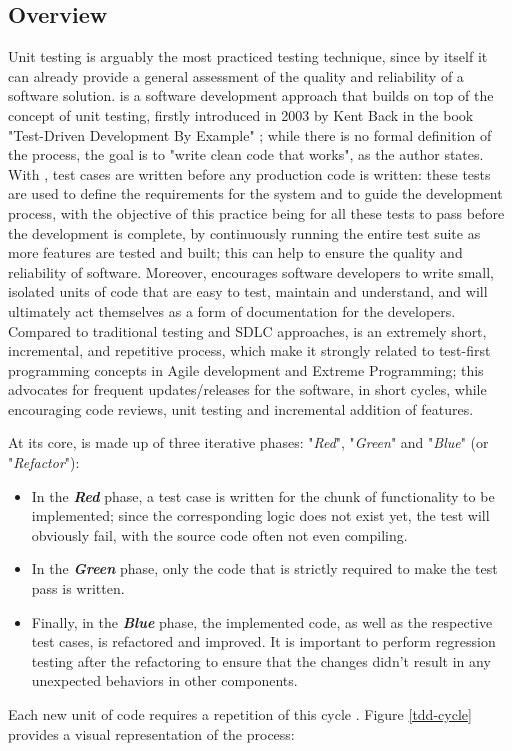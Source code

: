 \subsection{Overview}
Unit testing is arguably the most practiced testing technique, since by itself it can already provide a general assessment of the quality and reliability of a software solution. \tdd is a software development approach that builds on top of the concept of unit testing, firstly introduced in 2003 by Kent Back in the book "Test-Driven Development By Example" \cite{TDDByExample}; while there is no formal definition of the process, the goal is to "write clean code that works", as the author states. With \tdd, test cases are written before any production code is written: these tests are used to define the requirements for the system and to guide the development process, with 
the objective of this practice being for all these tests to pass before the development is complete, by continuously running the entire test suite as more features are tested and built; this can help to ensure the quality and reliability of software. Moreover, \tdd encourages software developers to write small, isolated units of code that are easy to test, maintain and understand, and will ultimately act themselves as a form of documentation for the developers. 
Compared to traditional testing and SDLC approaches, \tdd is an extremely short, incremental, and repetitive process, which make it strongly related to test-first programming concepts in Agile development and Extreme Programming; this advocates for frequent updates/releases for the software, in short cycles, while encouraging code reviews, unit testing and incremental addition of features.


At its core, \tdd is made up of three iterative phases: "\textit{Red}", "\textit{Green}" and "\textit{Blue}" (or "\textit{Refactor}"):
\begin{itemize}
    \item In the \textbf{\textit{Red}} phase, a test case is written for the chunk of functionality to be implemented; since the corresponding logic does not exist yet, the test will obviously fail, with the source code often not even compiling.
    \item In the \textbf{\textit{Green}} phase, only the code that is strictly required to make the test pass is written.
    \item Finally, in the \textbf{\textit{Blue}} phase, the implemented code, as well as the respective test cases, is refactored and improved. It is important to perform regression testing after the refactoring to ensure that the changes didn't result in any unexpected behaviors in other components.
\end{itemize}
Each new unit of code requires a repetition of this cycle \cite{GuidelinesTDD}. Figure \ref{tdd-cycle} provides a visual representation of the \tdd process:

